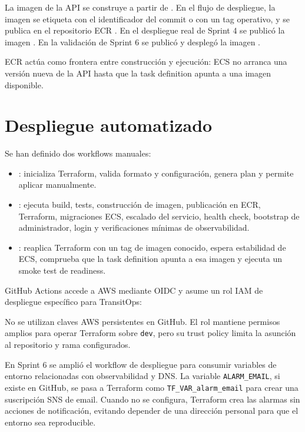 La imagen de la API se construye a partir de . En el flujo de despliegue, la imagen se etiqueta con el identificador del commit o con un tag operativo, y se publica en el repositorio ECR . En el despliegue real de Sprint 4 se publicó la imagen . En la validación de Sprint 6 se publicó y desplegó la imagen .

ECR actúa como frontera entre construcción y ejecución: ECS no arranca una versión nueva de la API hasta que la task definition apunta a una imagen disponible.

\section{Despliegue automatizado}
\label{sec:despliegue-automatizado}

Se han definido dos workflows manuales:

\begin{itemize}
  \item {}: inicializa Terraform, valida formato y configuración, genera plan y permite aplicar manualmente.
  \item {}: ejecuta build, tests, construcción de imagen, publicación en ECR, Terraform, migraciones ECS, escalado del servicio, health check, bootstrap de administrador, login y verificaciones mínimas de observabilidad.
  \item {}: reaplica Terraform con un tag de imagen conocido, espera estabilidad de ECS, comprueba que la task definition apunta a esa imagen y ejecuta un smoke test de readiness.
\end{itemize}

GitHub Actions accede a AWS mediante OIDC y asume un rol IAM de despliegue específico para TransitOps:

\begin{center}
{\small{}}
\end{center}

No se utilizan claves AWS persistentes en GitHub. El rol mantiene permisos amplios para operar Terraform sobre \texttt{dev}, pero su trust policy limita la asunción al repositorio y rama configurados.

En Sprint 6 se amplió el workflow de despliegue para consumir variables de entorno relacionadas con observabilidad y DNS. La variable \texttt{ALARM\_EMAIL}, si existe en GitHub, se pasa a Terraform como \texttt{TF\_VAR\_alarm\_email} para crear una suscripción SNS de email. Cuando no se configura, Terraform crea las alarmas sin acciones de notificación, evitando depender de una dirección personal para que el entorno sea reproducible.

